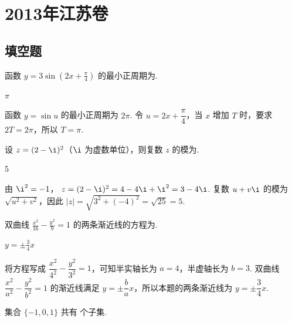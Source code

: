 \chapter{2013年江苏卷}

\section{填空题}

\begin{problem}
函数 \(y=3\sin\left(2x+\frac{\pi}{4}\right)\) 的最小正周期为\fillinblank{}.
\end{problem}

\begin{answer}
\(\pi\)
\end{answer}

\begin{solution}
函数 \(y=\sin u\) 的最小正周期为 \(2\pi\). 令 \(u=2x+\dfrac\pi4\)，当 \(x\) 增加 \(T\) 时，要求 \(2T=2\pi\)，所以
\(T=\pi\).
\end{solution}

\begin{problem}
设 \(z=(2-\i)^2\)（\(\i\) 为虚数单位），则复数 \(z\) 的模为\fillinblank{}.
\end{problem}

\begin{answer}
5
\end{answer}

\begin{solution}
由 \(\i^2=-1\)，
\(z=(2-\i)^2=4-4\i+\i^2=3-4\i\). 复数 \(u+v\i\) 的模为 \(\sqrt{u^2+v^2}\)，因此
\(|z|=\sqrt{3^2+(-4)^2}=\sqrt{25}=5\).
\end{solution}

\begin{problem}
双曲线 \(\frac{x^2}{16}-\frac{y^2}{9}=1\) 的两条渐近线的方程为\fillinblank{}.
\end{problem}

\begin{answer}
\(y=\pm\frac{3}{4}x\)
\end{answer}

\begin{solution}
将方程写成
\(\dfrac{x^2}{4^2}-\dfrac{y^2}{3^2}=1\)，可知半实轴长为 \(a=4\)，半虚轴长为 \(b=3\). 双曲线 \(\dfrac{x^2}{a^2}-\dfrac{y^2}{b^2}=1\) 的渐近线满足 \(y=\pm\dfrac ba x\)，所以本题的两条渐近线为
\(y=\pm\dfrac34x\).
\end{solution}

\begin{problem}
集合 \(\{-1,0,1\}\) 共有\fillinblank{} 个子集.
\end{problem}

